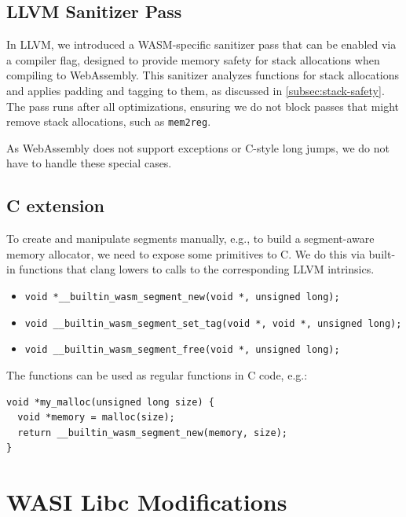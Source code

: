 \subsection{LLVM Sanitizer Pass}
\label{subsec:llvm-sanitizer-pass}

In LLVM, we introduced a \ac{WASM}-specific sanitizer pass that can be enabled via a compiler flag, designed to provide memory safety for stack allocations when compiling to WebAssembly.
This sanitizer analyzes functions for stack allocations and applies padding and tagging to them, as discussed in \cref{subsec:stack-safety}.
The pass runs after all optimizations, ensuring we do not block passes that might remove stack allocations, such as \texttt{mem2reg}.

As WebAssembly does not support exceptions or C-style long jumps, we do not have to handle these special cases.

\subsection{C extension}
\label{subsec:c-extension}

To create and manipulate segments manually, e.g., to build a segment-aware memory allocator, we need to expose some primitives to C.
We do this via built-in functions that clang lowers to calls to the corresponding LLVM intrinsics.

\begin{itemize}
  \item \lstinline[style=customc]{void *__builtin_wasm_segment_new(void *, unsigned long);}
  \item \lstinline[style=customc]{void __builtin_wasm_segment_set_tag(void *, void *, unsigned long);}
  \item \lstinline[style=customc]{void __builtin_wasm_segment_free(void *, unsigned long);}
\end{itemize}

The functions can be used as regular functions in C code, e.g.:

\begin{lstlisting}[frame=h,style=customc,
  label={lst:builtin-functions}]
void *my_malloc(unsigned long size) {
  void *memory = malloc(size);
  return __builtin_wasm_segment_new(memory, size);
}
\end{lstlisting}

\section{WASI Libc Modifications}
\label{sec:wasi-libc}

